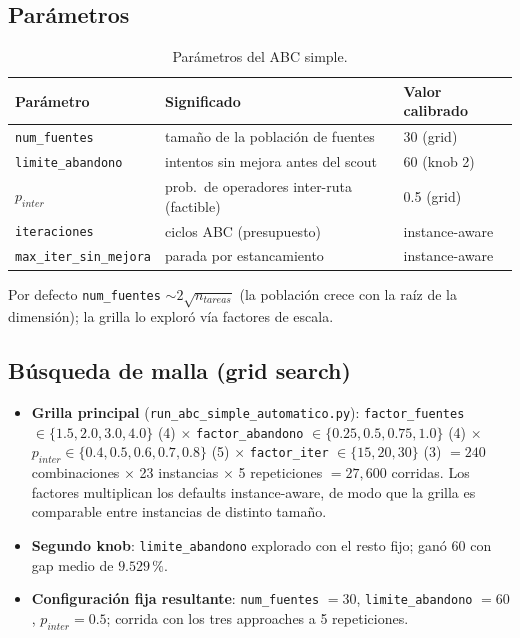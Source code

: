 \subsection{Parámetros}
\begin{table}[htbp]
\centering
\caption{Parámetros del ABC simple.}
\begin{tabular}{lll}
\toprule
Parámetro & Significado & Valor calibrado \\
\midrule
\texttt{num\_fuentes} & tamaño de la población de fuentes & 30 (grid) \\
\texttt{limite\_abandono} & intentos sin mejora antes del scout & 60 (knob 2) \\
$p_{inter}$ & prob.\ de operadores inter-ruta (factible) & 0.5 (grid) \\
\texttt{iteraciones} & ciclos ABC (presupuesto) & instance-aware \\
\texttt{max\_iter\_sin\_mejora} & parada por estancamiento & instance-aware \\
\bottomrule
\end{tabular}
\end{table}

Por defecto \texttt{num\_fuentes} $\sim 2\sqrt{n_{tareas}}$ (la población
crece con la raíz de la dimensión); la grilla lo exploró vía factores de
escala.

\subsection{Búsqueda de malla (grid search)}
\begin{itemize}
  \item \textbf{Grilla principal} (\texttt{run\_abc\_simple\_automatico.py}):
    \texttt{factor\_fuentes} $\in \{1.5, 2.0, 3.0, 4.0\}$ (4) $\times$
    \texttt{factor\_abandono} $\in \{0.25, 0.5, 0.75, 1.0\}$ (4) $\times$
    $p_{inter} \in \{0.4, 0.5, 0.6, 0.7, 0.8\}$ (5) $\times$
    \texttt{factor\_iter} $\in \{15, 20, 30\}$ (3)
    $= 240$ combinaciones $\times$ 23 instancias $\times$ 5 repeticiones
    $= 27{,}600$ corridas. Los factores multiplican los defaults
    instance-aware, de modo que la grilla es comparable entre instancias de
    distinto tamaño.
  \item \textbf{Segundo knob}: \texttt{limite\_abandono} explorado con el
    resto fijo; ganó $60$ con gap medio de $9.529\,\%$.
  \item \textbf{Configuración fija resultante}: \texttt{num\_fuentes} $= 30$,
    \texttt{limite\_abandono} $= 60$, $p_{inter} = 0.5$; corrida con los tres
    approaches a 5 repeticiones.
\end{itemize}

